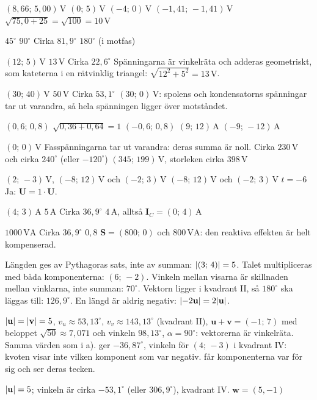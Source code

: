 \begin{facit}
  $(8{,}66;\, 5{,}00)\,\text{V}$  $(0;\, 5)\,\text{V}$  $(-4;\, 0)\,\text{V}$
 $(-1{,}41;\, -1{,}41)\,\text{V}$  $\sqrt{75{,}0 + 25} = \sqrt{100} = 10\,\text{V}$

  $45^{\circ}$  $90^{\circ}$  Cirka $81{,}9^{\circ}$
 $180^{\circ}$ (i motfas)

  $(12;\, 5)\,\text{V}$  $13\,\text{V}$  Cirka $22{,}6^{\circ}$
 Spänningarna är vinkelräta och adderas geometriskt, som kateterna i en rätvinklig
triangel: $\sqrt{12^2 + 5^2} = 13\,\text{V}$.

  $(30;\, 40)\,\text{V}$  $50\,\text{V}$  Cirka $53{,}1^{\circ}$
 $(30;\, 0)\,\text{V}$: spolens och kondensatorns spänningar tar ut varandra, så hela
spänningen ligger över motståndet.

  $(0{,}6;\, 0{,}8)$  $\sqrt{0{,}36 + 0{,}64} = 1$
 $(-0{,}6;\, 0{,}8)$  $(9;\, 12)\,\text{A}$  $(-9;\, -12)\,\text{A}$

  $(0;\, 0)\,\text{V}$
 Fasspänningarna tar ut varandra: deras summa är noll.
 Cirka $230\,\text{V}$ och cirka $240^{\circ}$ (eller $-120^{\circ}$)
 $(345;\, 199)\,\text{V}$, storleken cirka $398\,\text{V}$

  $(2;\, -3)\,\text{V}$, $(-8;\, 12)\,\text{V}$ och $(-2;\, 3)\,\text{V}$
 $(-8;\, 12)\,\text{V}$ och $(-2;\, 3)\,\text{V}$
 $t = -6$
 Ja: $\mathbf{U} = 1 \cdot \mathbf{U}$.

  $(4;\, 3)\,\text{A}$  $5\,\text{A}$  Cirka $36{,}9^{\circ}$
 $4\,\text{A}$, alltså $\mathbf{I}_C = (0;\, 4)\,\text{A}$

  $1000\,\text{VA}$  Cirka $36{,}9^{\circ}$  $0{,}8$
 $\mathbf{S} = (800;\, 0)$ och $800\,\text{VA}$: den reaktiva effekten är helt kompenserad.

  Längden ges av Pythagoras sats, inte av summan: $\lvert(3;\, 4)\rvert = 5$.
 Talet multipliceras med båda komponenterna: $(6;\, -2)$.
 Vinkeln mellan visarna är skillnaden mellan vinklarna, inte summan: $70^{\circ}$.
 Vektorn ligger i kvadrant II, så $180^{\circ}$ ska läggas till: $126{,}9^{\circ}$.
 En längd är aldrig negativ: $\lvert-2\mathbf{u}\rvert = 2\lvert\mathbf{u}\rvert$.

  $\lvert\mathbf{u}\rvert = \lvert\mathbf{v}\rvert = 5$, $v_u \approx 53{,}13^{\circ}$,
$v_v \approx 143{,}13^{\circ}$ (kvadrant II), $\mathbf{u} + \mathbf{v} = (-1;\, 7)$ med beloppet
$\sqrt{50} \approx 7{,}071$ och vinkeln $98{,}13^{\circ}$, $\alpha = 90^{\circ}$: vektorerna är
vinkelräta.
 Samma värden som i a).
  ger $-36{,}87^{\circ}$, vinkeln för $(4;\, -3)$ i kvadrant IV:
kvoten visar inte vilken komponent som var negativ.  får komponenterna var för
sig och ser deras tecken.

  $\lvert\mathbf{u}\rvert = 5$; vinkeln är cirka $-53{,}1^{\circ}$ (eller
$306{,}9^{\circ}$), kvadrant IV.
 $\mathbf{w} = (5, -1)$

\end{facit}
